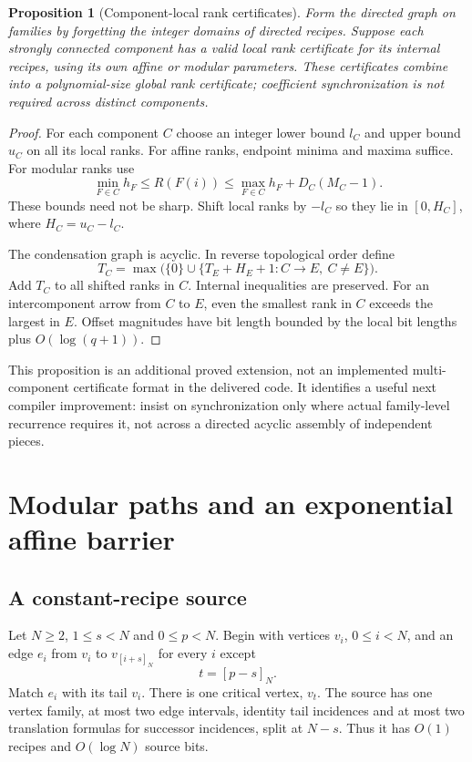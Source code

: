 \documentclass[11pt,letterpaper]{article}
\newtheorem{proposition}[theorem]{Proposition}
\theoremstyle{definition}
\theoremstyle{remark}\newtheorem{remark}[theorem]{Remark}
\newcommand{\res}[2]{\left[#1\right]_{#2}}
\begin{document}
\begin{proposition}[Component-local rank certificates]
\label{prop:components}
Form the directed graph on families by forgetting the integer domains of directed recipes. Suppose each strongly connected component has a valid local rank certificate for its internal recipes, using its own affine or modular parameters. These certificates combine into a polynomial-size global rank certificate; coefficient synchronization is not required across distinct components.
\end{proposition}
\begin{proof}
For each component $C$ choose an integer lower bound $l_C$ and upper bound $u_C$ on all its local ranks. For affine ranks, endpoint minima and maxima suffice. For modular ranks use
\[
 \min_{F\in C}h_F\leq R(F(i))
       \leq\max_{F\in C}h_F+D_C(M_C-1).
\]
These bounds need not be sharp. Shift local ranks by $-l_C$ so they lie in $[0,H_C]$, where $H_C=u_C-l_C$.

The condensation graph is acyclic. In reverse topological order define
\[
 T_C=\max\bigl(\{0\}\cup
       \{T_E+H_E+1:C\to E,\ C\ne E\}\bigr).
\]
Add $T_C$ to all shifted ranks in $C$. Internal inequalities are preserved. For an intercomponent arrow from $C$ to $E$, even the smallest rank in $C$ exceeds the largest in $E$. Offset magnitudes have bit length bounded by the local bit lengths plus $O(\log(q+1))$.
\end{proof}

This proposition is an additional proved extension, not an implemented multi-component certificate format in the delivered code. It identifies a useful next compiler improvement: insist on synchronization only where actual family-level recurrence requires it, not across a directed acyclic assembly of independent pieces.

\section{Modular paths and an exponential affine barrier}
\label{sec:paths}

\subsection{A constant-recipe source}

Let $N\geq2$, $1\leq s<N$ and $0\leq p<N$. Begin with vertices $v_i$, $0\leq i<N$, and an edge $e_i$ from $v_i$ to $v_{\res{i+s}{N}}$ for every $i$ except
\[
                              t=\res{p-s}{N}.
\]
Match $e_i$ with its tail $v_i$. There is one critical vertex, $v_t$. The source has one vertex family, at most two edge intervals, identity tail incidences and at most two translation formulas for successor incidences, split at $N-s$. Thus it has $O(1)$ recipes and $O(\log N)$ source bits.
\end{document}
